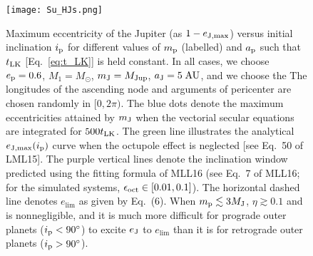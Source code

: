 \documentclass[11pt]{article}
\begin{document}
\begin{figure}[h]
    \centering
    \texttt{[image: Su\_HJs.png]}
    \caption{Maximum eccentricity of the Jupiter (as $1 - e_{\rm J, \max}$)
    versus initial inclination $i_{\rm p}$ for different values of $m_{\rm p}$
    (labelled) and $a_{\rm p}$ such that $t_{\rm LK}$ [Eq.~\eqref{eq:t_LK}] is
    held constant. In all cases, we choose $e_{\rm p} = 0.6$, $M_1 = M_{\odot}$,
    $m_{\rm J} = M_{\rm Jup}$, $a_{\rm J} = 5\;\mathrm{AU}$, and we choose the
    The longitudes of the ascending node and arguments of pericenter are chosen
    randomly in $[0, 2\pi)$. The blue dots denote the maximum eccentricities
    attained by $m_{\rm J}$ when the vectorial secular equations are integrated
    for $500 t_{\rm LK}$. The green line illustrates the analytical $e_{\rm J,
    \max}(i_{\rm p})$ curve
    when the octupole effect is neglected [see Eq.~50 of LML15].
    The purple vertical lines denote the inclination
    window predicted using the fitting formula of MLL16 (see Eq.~7 of MLL16; for
    the simulated systems, $\epsilon_{\rm oct} \in [0.01, 0.1]$). The horizontal
    dashed line denotes $e_{\lim}$ as given by Eq.~(6).
    When $m_{\rm p} \lesssim 3M_{\rm J}$, $\eta \gtrsim 0.1$ and is
    nonnegligible, and it is much more difficult for prograde outer planets
    ($i_{\rm p} < 90^\circ$) to excite $e_{\rm J}$ to $e_{\lim}$ than it is for
    retrograde outer planets ($i_{\rm p} > 90^\circ$). }\label{fig:YS_emaxes}
\end{figure}
\end{document}
